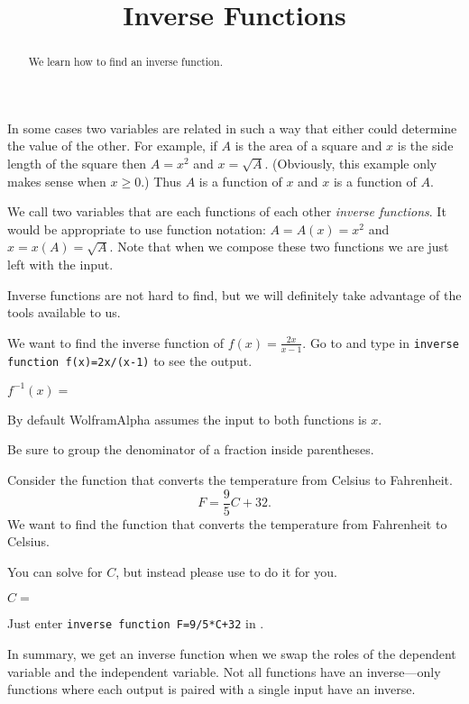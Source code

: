 \documentclass{ximera}
\title{Inverse Functions}
\begin{document}
\begin{abstract}
We learn how to find an inverse function.
\end{abstract}
\maketitle

In some cases two variables are related in such a way that either could determine the value of the other. For example, if $A$ is the area of a square and $x$ is the side length of the square then $A=x^2$ and $x=\sqrt{A}$. (Obviously, this example only makes sense when $x\geq 0$.) Thus $A$ is a function of $x$ and $x$ is a function of $A$.

We call two variables that are each functions of each other \emph{inverse functions}. It would be appropriate to use function notation: $A=A(x)=x^2$ and $x=x(A)=\sqrt{A}$. Note that when we compose these two functions we are just left with the input. 

Inverse functions are not hard to find, but we will definitely take advantage of the tools available to us. 

\begin{question}
We want to find the inverse function of $f(x)=\frac{2x}{x-1}$.
Go to  and type in \verb|inverse function f(x)=2x/(x-1)| to see the output.

$f^{-1}(x)=$ 
\begin{hint}
By default WolframAlpha assumes the input to both functions is $x$.
\end{hint}
\begin{hint}
Be sure to group the denominator of a fraction inside parentheses.
\end{hint}

\end{question}



\begin{question}
Consider the function that converts the temperature from Celsius to Fahrenheit. 
\[
F=\frac{9}{5}C+32.
\]
We want to find the function that converts the temperature from Fahrenheit to Celsius.

You can solve for $C$, but instead please use  to do it for you.


$C=$ 
\begin{hint}
Just enter \verb|inverse function F=9/5*C+32| in .
\end{hint}


In summary, we get an inverse function when we swap the roles of the dependent variable and the independent variable. Not all functions have an inverse---only functions where each output is paired with a single input have an inverse.
\end{question}
\end{document}
